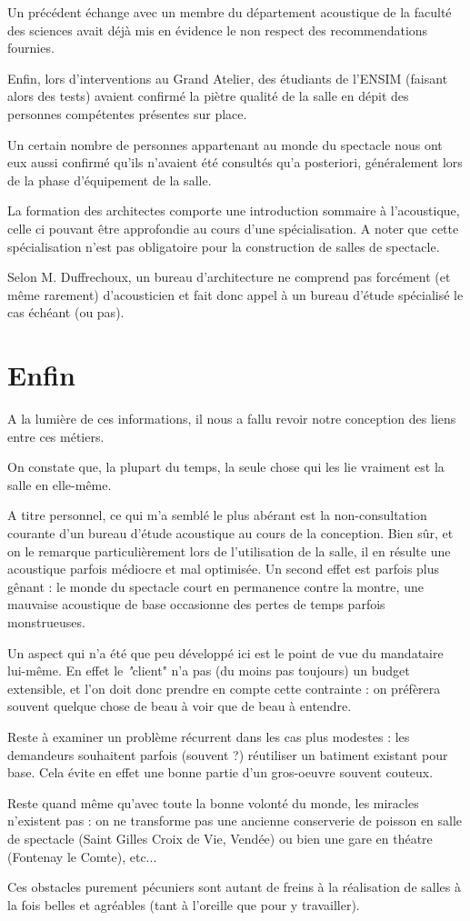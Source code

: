 \documentclass[a4paper, 11pt]{report}
\begin{document}
Un précédent échange avec un membre du département acoustique de la faculté des sciences avait déjà mis en évidence le non respect des recommendations fournies.

Enfin, lors d'interventions au Grand Atelier, des étudiants de l'ENSIM (faisant alors des tests) avaient confirmé la piètre qualité de la salle en dépit des personnes compétentes présentes sur place.

\medskip

Un certain nombre de personnes appartenant au monde du spectacle nous ont eux aussi confirmé qu'ils n'avaient été consultés qu'a posteriori, généralement lors de la phase d'équipement de la salle.

La formation des architectes comporte une introduction sommaire à l'acoustique, celle ci pouvant être approfondie au cours d'une spécialisation.
A noter que cette spécialisation n'est pas obligatoire pour la construction de salles de spectacle.


Selon M. Duffrechoux, un bureau d'architecture ne comprend pas forcément (et même rarement) d'acousticien et fait donc appel à un bureau d'étude spécialisé le cas échéant (ou pas).

\section{Enfin}

A la lumière de ces informations, il nous a fallu revoir notre conception des liens entre ces métiers.

On constate que, la plupart du temps, la seule chose qui les lie vraiment est la salle en elle-même.

A titre personnel, ce qui m'a semblé le plus abérant est la non-consultation courante d'un bureau d'étude acoustique au cours de la conception.
Bien sûr, et on le remarque particulièrement lors de l'utilisation de la salle, il en résulte une acoustique parfois médiocre et mal optimisée.
Un second effet est parfois plus gênant : le monde du spectacle court en permanence contre la montre, une mauvaise acoustique de base occasionne des pertes de temps parfois monstrueuses.

Un aspect qui n'a été que peu développé ici est le point de vue du mandataire lui-même.
En effet le {\emph "client"} n'a pas (du moins pas toujours) un budget extensible, et l'on doit donc prendre en compte cette contrainte : on préfèrera souvent quelque chose de beau à voir que de beau à entendre.

Reste à examiner un problème récurrent dans les cas plus modestes : les demandeurs souhaitent parfois (souvent ?) réutiliser un batiment existant pour base.
Cela évite en effet une bonne partie d'un gros-oeuvre souvent couteux.

Reste quand même qu'avec toute la bonne volonté du monde, les miracles n'existent pas : on ne transforme pas une ancienne conserverie de poisson en salle de spectacle (Saint Gilles Croix de Vie, Vendée) ou bien une gare en théatre (Fontenay le Comte), etc...


Ces obstacles purement pécuniers sont autant de freins à la réalisation de salles à la fois belles et agréables (tant à l'oreille que pour y travailler).
\end{document}
